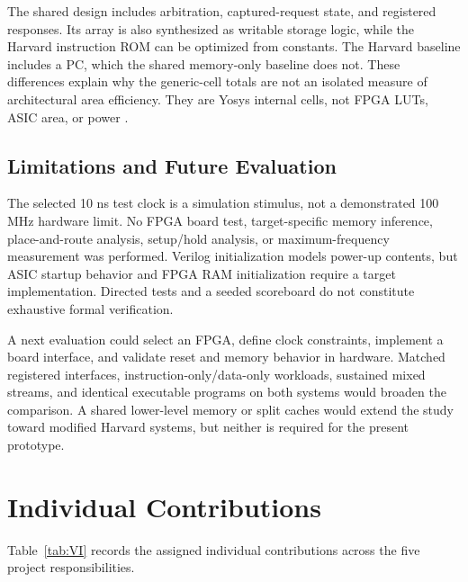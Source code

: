 \documentclass[conference,letterpaper]{IEEEtran}
\begin{document}
The shared design includes arbitration, captured-request state, and registered responses. Its array is also synthesized as writable storage logic, while the Harvard instruction ROM can be optimized from constants. The Harvard baseline includes a PC, which the shared memory-only baseline does not. These differences explain why the generic-cell totals are not an isolated measure of architectural area efficiency. They are Yosys internal cells, not FPGA LUTs, ASIC area, or power \cite{ref6}.

\subsection{Limitations and Future Evaluation}

The selected 10 ns test clock is a simulation stimulus, not a demonstrated 100 MHz hardware limit. No FPGA board test, target-specific memory inference, place-and-route analysis, setup/hold analysis, or maximum-frequency measurement was performed. Verilog initialization models power-up contents, but ASIC startup behavior and FPGA RAM initialization require a target implementation. Directed tests and a seeded scoreboard do not constitute exhaustive formal verification.

A next evaluation could select an FPGA, define clock constraints, implement a board interface, and validate reset and memory behavior in hardware. Matched registered interfaces, instruction-only/data-only workloads, sustained mixed streams, and identical executable programs on both systems would broaden the comparison. A shared lower-level memory or split caches would extend the study toward modified Harvard systems, but neither is required for the present prototype.

\section{Individual Contributions}

Table~\ref{tab:VI} records the assigned individual contributions across the five project responsibilities.
\end{document}
